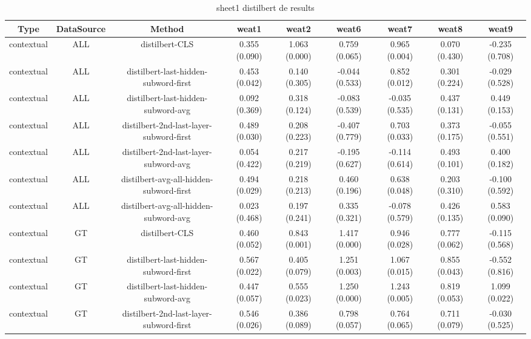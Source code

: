\begin{sidewaystable}[htb]
    \centering
    \caption{sheet1 distilbert de results}
    \label{appendix_tab:sheet1_distilbert_de_results}
    \small
    \begin{tabular}{@{}ccccccccc@{}}
        \toprule
        Type & DataSource & Method & weat1 & weat2 & weat6 & weat7 & weat8 & weat9 \\
        \midrule
        contextual & ALL & distilbert-CLS & 0.355 (0.090) & 1.063 (0.000) & 0.759 (0.065) & 0.965 (0.004) & 0.070 (0.430) & -0.235 (0.708) \\
        contextual & ALL & distilbert-last-hidden-subword-first & 0.453 (0.042) & 0.140 (0.305) & -0.044 (0.533) & 0.852 (0.012) & 0.301 (0.224) & -0.029 (0.528) \\
        contextual & ALL & distilbert-last-hidden-subword-avg & 0.092 (0.369) & 0.318 (0.124) & -0.083 (0.539) & -0.035 (0.535) & 0.437 (0.131) & 0.449 (0.153) \\
        contextual & ALL & distilbert-2nd-last-layer-subword-first & 0.489 (0.030) & 0.208 (0.223) & -0.407 (0.779) & 0.703 (0.033) & 0.373 (0.175) & -0.055 (0.551) \\
        contextual & ALL & distilbert-2nd-last-layer-subword-avg & 0.054 (0.422) & 0.217 (0.219) & -0.195 (0.627) & -0.114 (0.614) & 0.493 (0.101) & 0.400 (0.182) \\
        contextual & ALL & distilbert-avg-all-hidden-subword-first & 0.494 (0.029) & 0.218 (0.213) & 0.460 (0.196) & 0.638 (0.048) & 0.203 (0.310) & -0.100 (0.592) \\
        contextual & ALL & distilbert-avg-all-hidden-subword-avg & 0.023 (0.468) & 0.197 (0.241) & 0.335 (0.321) & -0.078 (0.579) & 0.426 (0.135) & 0.583 (0.090) \\
        contextual & GT & distilbert-CLS & 0.460 (0.052) & 0.843 (0.001) & 1.417 (0.000) & 0.946 (0.028) & 0.777 (0.062) & -0.115 (0.568) \\
        contextual & GT & distilbert-last-hidden-subword-first & 0.567 (0.022) & 0.405 (0.079) & 1.251 (0.003) & 1.067 (0.015) & 0.855 (0.043) & -0.552 (0.816) \\
        contextual & GT & distilbert-last-hidden-subword-avg & 0.447 (0.057) & 0.555 (0.023) & 1.250 (0.000) & 1.243 (0.005) & 0.819 (0.053) & 1.099 (0.022) \\
        contextual & GT & distilbert-2nd-last-layer-subword-first & 0.546 (0.026) & 0.386 (0.089) & 0.798 (0.057) & 0.764 (0.065) & 0.711 (0.079) & -0.030 (0.525) \\

\end{tabular}
\end{sidewaystable}
